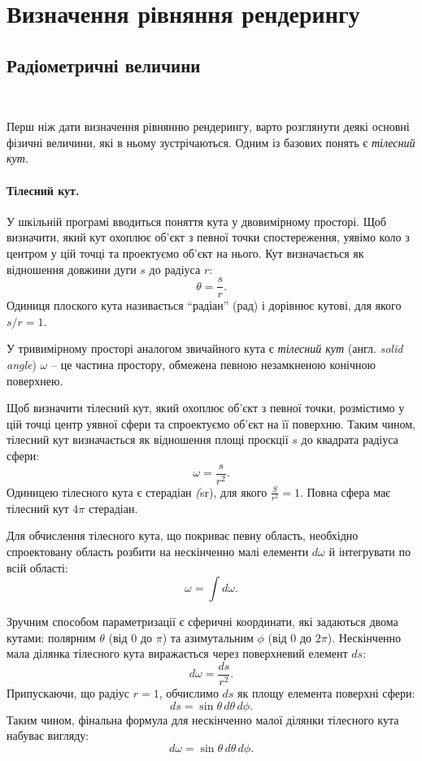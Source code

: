 \section{Визначення рівняння рендерингу}
   \setcounter{equation}{0}
 \setcounter{theorem}{0}

 \subsection{Радіометричні величини} \\

\par
Перш ніж дати визначення рівнянню рендерингу, варто розглянути деякі основні фізичні величини, які в ньому зу\-стрі\-ча\-ють\-ся. Одним із базових понять є \textit{тілесний кут}.

\paragraph{Тілесний кут.}
\par
У шкільній програмі вводиться поняття кута у двовимірному просторі. Щоб визначити, який кут охоплює об’єкт з певної точки спостереження, уявімо коло з центром у цій точці та проектуємо об’єкт на нього. Кут визначається як відношення довжини дуги $s$ до радіуса $r$:
\[
\theta = \frac{s}{r}.
\]
Одиниця плоского кута називається “радіан” (рад) і дорівнює кутові, для якого $s/r=1$.
\par
У тривимірному просторі аналогом звичайного кута є \textit{тілесний кут} (англ. \textit{solid angle}) $\omega$ --  це частина простору, обмежена певною незамкненою конічною поверхнею. 
\par
Щоб визначити тілесний кут, який охоплює об’єкт з певної точки, роз\-міс\-ти\-мо у цій точці центр уявної сфери та спроектуємо об’єкт на її поверхню. Таким чином, тілесний кут визначається як відношення площі проєкції $s$ до квадрата радіуса сфери:
\[
\omega = \frac{s}{r^2}.
\]
Одиницею тілесного кута є стерадіан \textit({sr}),  для якого $\frac{S}{r^2}=1$. Повна сфера має тілесний кут $4\pi$ стерадіан.

\par
Для обчислення тілесного кута, що покриває певну область, необхідно спроектовану область розбити на нескінченно малі елементи $d\omega$ й інтегрувати по всій області:
\[
\omega = \int d\omega.
\]

\par
Зручним способом параметризації є сферичні координати, які задаються двома кутами: полярним $\theta$ (від $0$ до $\pi$) та азимутальним $\phi$ (від $0$ до $2\pi$). Нескінченно мала ділянка тілесного кута виражається через поверхневий елемент $ds$:
\[
d\omega = \frac{ds}{r^2}.
\]
Припускаючи, що радіус $r = 1$, обчислимо $ds$ як площу елемента поверхні сфери:
\[
ds = \sin{\theta} \, d\theta \, d\phi.
\]
Таким чином, фінальна формула для нескінченно малої ділянки тілесного кута набуває вигляду:
\[
d\omega = \sin{\theta} \, d\theta \, d\phi.
\]

